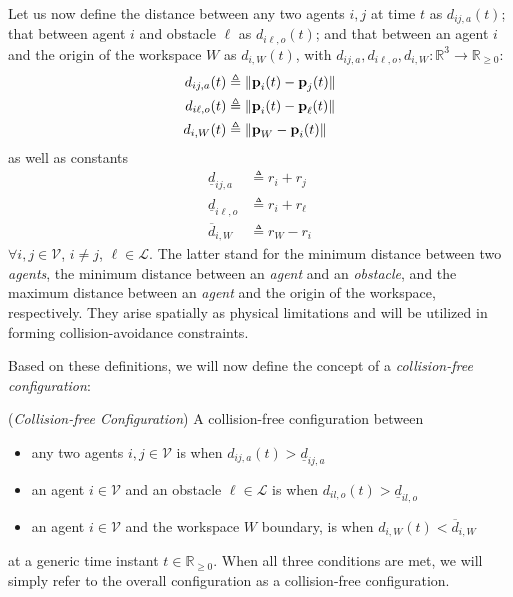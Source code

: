 Let us now define the distance between any two agents $i,j$ at time $t$ as
$d_{ij,a}(t)$; that between agent $i$ and obstacle $\ell$ as $d_{i\ell,o}(t)$;
and that between an agent $i$ and the origin of the workspace $W$ as
$d_{i,W}(t)$, with $d_{ij,a}, d_{i\ell,o}, d_{i,W} : \mathbb{R}^3 \to \mathbb{R}_{\geq 0}$:
\begin{subequations}
	\begin{align}
    d_{ij,a}(t) &\triangleq \| \bm{\mathbf{p}}_i(t) - \bm{\mathbf{p}}_j(t) \| \\
    d_{i\ell,o}(t) &\triangleq \| \bm{\mathbf{p}}_i(t) - \bm{\mathbf{p}}_\ell(t) \| \\
    d_{i,W}(t) &\triangleq \| \bm{\mathbf{p}}_W - \bm{\mathbf{p}}_i(t) \|
	\end{align}
\end{subequations}
as well as constants
\begin{subequations}
	\begin{align}
    \underline{d}_{ij, a} &\triangleq r_{i} + r_{j} \\
    \underline{d}_{i\ell, o} &\triangleq r_{i} + r_{\ell} \\
    \overline{d}_{i,W} &\triangleq r_W - r_i
	\end{align}
\end{subequations}
$\forall i, j \in \mathcal{V}$, $i \neq j$, $\ell \in \mathcal{L}$.
The latter stand for the minimum distance between two \textit{agents}, the
minimum distance between an \textit{agent} and an \textit{obstacle},
and the maximum distance between an \textit{agent} and the origin of the
workspace, respectively. They arise spatially as physical limitations and will
be utilized in forming collision-avoidance constraints.

Based on these definitions, we will now define the concept of a
\textit{collision-free configuration}:
\begin{bw_box}
\begin{definition} (\textit{Collision-free Configuration})
\label{definition:collision_free_conf}
  A collision-free configuration between
  \begin{itemize}
    \item any two agents $i,j \in \mathcal{V}$ is when $d_{ij,a}(t) > \underline{d}_{ij,a}$
    \item an agent $i \in \mathcal{V}$ and an obstacle $\ell \in \mathcal{L}$
     is when $d_{il,o}(t) > \underline{d}_{il,o}$
    \item an agent $i \in \mathcal{V}$ and the workspace $W$ boundary,
     is when $d_{i,W}(t) < \overline{d}_{i,W}$
  \end{itemize}
  at a generic time instant $t \in \mathbb{R}_{\geq 0}$. When all three
  conditions are met, we will simply refer to the overall configuration as
  a collision-free configuration.
\end{definition}
\end{bw_box}
